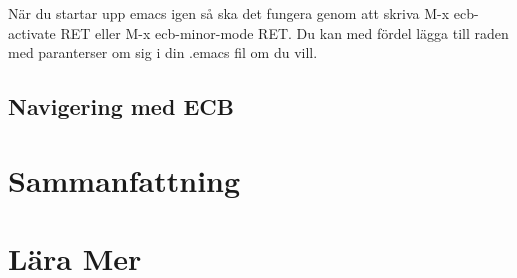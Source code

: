\documentclass[12pt]{article} %
\begin{document}
När du startar upp emacs igen så ska det fungera genom att skriva M-x ecb-activate RET eller M-x ecb-minor-mode RET. Du kan med fördel lägga till raden med paranterser om sig i din .emacs fil om du vill.
\newpage
\subsection{Navigering med ECB}








\newpage
\section{Sammanfattning} %
\newpage
\section{Lära Mer}

\newpage
\begin{thebibliography}{99} %

 
\end{thebibliography}

\end{document}
